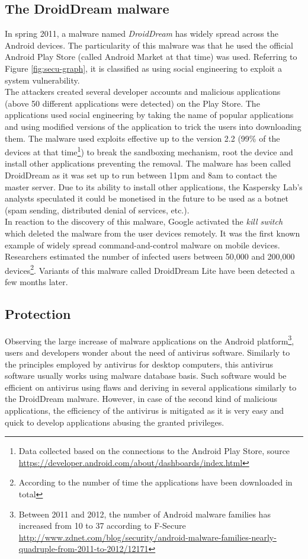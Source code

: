 \subsection{The DroidDream malware}

In spring 2011, a malware named \emph{DroidDream} has widely spread across the Android devices.
The particularity of this malware was that he used the official Android Play Store (called Android Market at that time) was used.
Referring to Figure \ref{fig:secu-graph}, it is classified as using social engineering to exploit a system vulnerability.\\

The attackers created several developer accounts and malicious applications (above 50 different applications were detected) on the Play Store.
The applications used social engineering by taking the name of popular applications and using modified versions of the application to trick the users into downloading them.
The malware used exploits effective up to the version 2.2 (99\% of the devices at that time\footnote{Data collected based on the connections to the Android Play Store, source \url{https://developer.android.com/about/dashboards/index.html}}) to break the sandboxing mechanism, root the device and install other applications preventing the removal.
The malware has been called DroidDream as it was set up to run between 11pm and 8am to contact the master server.
Due to its ability to install other applications, the Kaspersky Lab's analysts speculated it could be monetised in the future to be used as a botnet (spam sending, distributed denial of services, etc.).\\

In reaction to the discovery of this malware, Google activated the \emph{kill switch} which deleted the malware from the user devices remotely.
It was the first known example of widely spread command-and-control malware on mobile devices.
Researchers estimated the number of infected users between 50,000 and 200,000 devices\footnote{According to the number of time the applications have been downloaded in total}.
Variants of this malware called DroidDream Lite have been detected a few months later.

\subsection{Protection}
Observing the large increase of malware applications on the Android platform\footnote{Between 2011 and 2012, the number of Android malware families has increased from 10 to 37 according to F-Secure \url{http://www.zdnet.com/blog/security/android-malware-families-nearly-quadruple-from-2011-to-2012/12171}}, users and developers wonder about the need of antivirus software.
Similarly to the principles employed by antivirus for desktop computers, this antivirus software usually works using malware database basis.
Such software would be efficient on antivirus using flaws and deriving in several applications similarly to the DroidDream malware.
However, in case of the second kind of malicious applications, the efficiency of the antivirus is mitigated as it is very easy and quick to develop applications abusing the granted privileges.\\

